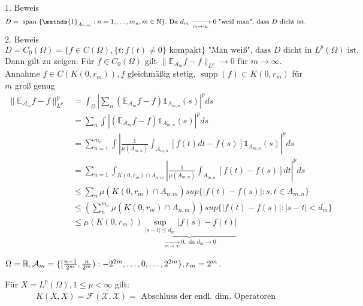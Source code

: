 \begin{beweis}
	1. Beweis
	\[ D = \text{ span }\{ \mathds{1}_{A_{n, m}} : n = 1, \dotsc, m_{n}, m \in \MdN \}. \text{ Da } d_{m} \xrightarrow[m \rightarrow \infty]{} 0 \text{ "wei{\ss} man", dass } D \text{ dicht ist.} \]
	2. Beweis
	\[ D = C_{0}(\Omega) = \{ f \in C(\Omega), \{ t: f(t) \neq 0 \} \text{ kompakt} \} \text{ "Man wei{\ss}", dass } D \text{ dicht in } L^{p}(\Omega) \text{ ist.} \]
	Dann gilt zu zeigen: Für $f \in C_{0}(\Omega)$ gilt $\| \mathds{E}_{\mathcal{A}_{m}} f - f \|_{L^{p}} \rightarrow 0$ für $m \rightarrow \infty$. \\
		Annahme $f \in C(K(0, r_{m})), f$ gleichmä{\ss}ig stetig, $\operatorname{supp}(f) \subset K(0, r_{m})$ für $m$ gro{\ss} genug
	\begin{align*}
		\| \mathds{E}_{\mathcal{A}_{m}} f - f \|_{L^{p}}^{p} & =  \int_{\Omega} | \sum_{n} \left( \mathds{E}_{\mathcal{A}_{m}} f - f \right) \mathds{1}_{A_{m, n}}(s) |^{p} ds \\
		& = \sum_{n} \int \left| \left( \mathds{E}_{\mathcal{A}_{m}} f - f \right) \mathds{1}_{A_{m, n}}(s) \right|^{p} ds	 \\
		& = \sum_{n = 1}^{m_{n}} \int \left| \frac{1}{\mu(A_{m, n})} \int_{A_{m,n }} \left[ f(t) dt - f(s) \right] \mathds{1}_{A_{m, n}}(s) \right|^{p} ds \\
		& = \sum_{n = 1} \int_{K(0, r_{m}) \cap A_{n, m}} \left| \frac{1}{\mu(A_{m, n})} \int_{A_{m,n }} \left[ f(t) - f(s) \right] dt \right|^{p} ds \\
		& \leq \sum_{n} \mu\left( K(0, r_{m}) \cap A_{n, m} \right) sup \{ \left| f(t) - f(s) \right| : s, t \in A_{m, n} \} \\
		& \leq \left( \sum_{n}^{m_{n}} \mu\left( K(0, r_{m}) \cap A_{n, m} \right) \right) sup \{ \left| f(t) - f(s) \right| : | s - t| < d_{m} \} \\
		& \leq \mu\left( K(0, r_{m}) \right) \underbrace{\sup_{|s - t| \leq d_{m}} |f(s) - f(t)|}_{\xrightarrow[m \rightarrow \infty]{} 0, \text{ da } d_{m} \rightarrow 0}
	\end{align*}
\end{beweis}


\begin{beispiel*}
	$ \Omega = \mathbb{R}, \mathcal{A}_{m} = \{ [\frac{n - 1}{2^{m}}, \frac{n}{2^{m}}): -2^{2m}, \dotsc, 0, \dotsc, 2^{2m} \}, r_{m} = 2^{m}$.
\end{beispiel*}


\begin{kor*} 
	Für $X = L^{p}(\Omega), 1 \leq p < \infty$ gilt:
	\[ K(X, X) = \overline{\mathcal{F(X, X)}} = \text{ Abschluss der endl. dim. Operatoren} \]
\end{kor*}

